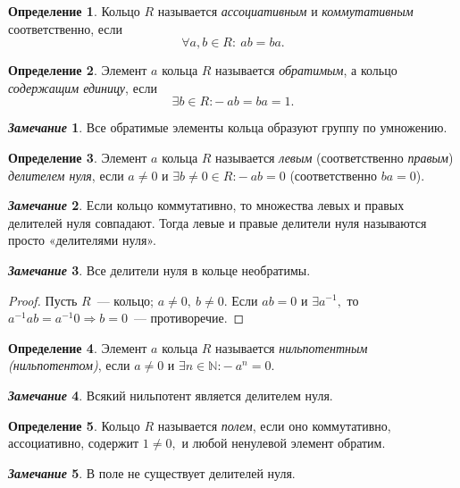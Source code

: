 \documentclass[a4paper, 14pt]{extarticle}
\newcommand{\naturals}{\mathbb{N}}
\newcommand{\suchthat}{{:}{-} \ }
\theoremstyle{definition}
\newtheorem*{remark}{\textit{Замечание}}
\newtheorem{definition}{Определение}
\theoremstyle{plain}
\numberwithin{theorem}{section}
\numberwithin{definition}{section}
\numberwithin{statement}{section}
\numberwithin{lemma}{section}
\numberwithin{consequence}{section}
\begin{document}
	\begin{definition}
		Кольцо $R$ называется \textit{ассоциативным} и \textit{коммутативным} соответственно, если 
		\begin{equation*}
			\forall a, b \in R{:} \ ab = ba.
		\end{equation*}
	\end{definition}
	\begin{definition}
		Элемент $a$ кольца $R$ называется \textit{обратимым}, а кольцо \textit{содержащим единицу}, если 
		\begin{equation*}
			\exists b \in R \suchthat ab = ba = 1.
		\end{equation*}
	\end{definition}
	\begin{remark}
		Все обратимые элементы кольца образуют группу по умножению.
	\end{remark}
	\begin{definition}
		Элемент $a$ кольца $R$ называется \textit{левым} (соответственно \textit{правым}) \textit{делителем нуля}, если ${a \neq 0}$ и ${\exists b \neq 0 \in R \suchthat ab = 0}$ (соответственно $ba = 0$).
	\end{definition}
	\begin{remark}
		Если кольцо коммутативно, то множества левых и правых делителей нуля совпадают. Тогда левые и правые делители нуля называются просто «делителями нуля».
	\end{remark}
	\begin{remark}
		Все делители нуля в кольце необратимы.
	\end{remark}
	\begin{proof}
		Пусть $R$~--- кольцо; ${a \neq 0, \ b \neq 0.}$ Если ${ab = 0}$ и ${\exists a^{-1},}$ то ${a^{-1}ab = a^{-1}0 \Longrightarrow b = 0}$~--- противоречие.
	\end{proof}
	\begin{definition}
		Элемент $a$ кольца $R$ называется \textit{нильпотентным (нильпотентом)}, если ${a \neq 0}$ и ${\exists n \in \naturals \suchthat a^n = 0.}$
	\end{definition}
	\begin{remark}
		Всякий нильпотент является делителем нуля.
	\end{remark}
	\begin{definition}
		Кольцо $R$ называется \textit{полем}, если оно коммутативно, ассоциативно, содержит ${1 \neq 0,}$ и любой ненулевой элемент обратим.
	\end{definition}
	\begin{remark}
		В поле не существует делителей нуля.
	\end{remark}
\end{document}
